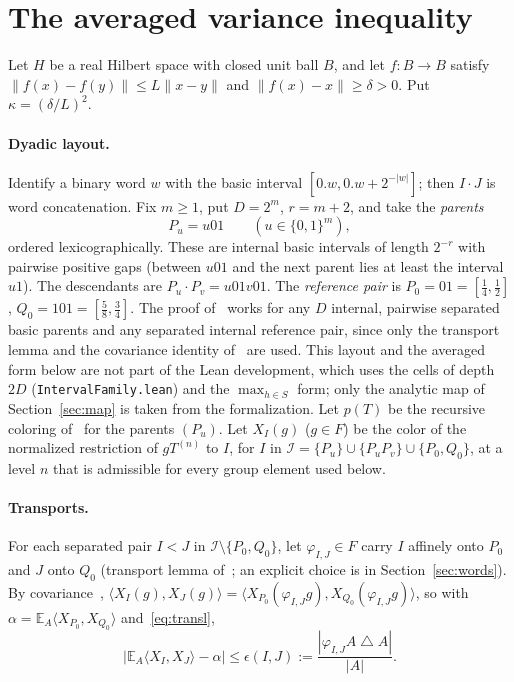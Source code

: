 \documentclass[11pt]{article}
\theoremstyle{definition}
\theoremstyle{remark}
\newcommand{\norm}[1]{\lVert #1\rVert}
\newcommand{\ip}[2]{\langle #1,#2\rangle}
\newcommand{\E}{\mathbb{E}}
\newcommand{\sd}{\mathbin{\triangle}}
\begin{document}
\section{The averaged variance inequality}\label{sec:variance}

Let $H$ be a real Hilbert space with closed unit ball $B$, and let $f:B\to B$ satisfy
$\norm{f(x)-f(y)}\le L\norm{x-y}$ and $\norm{f(x)-x}\ge\delta>0$. Put $\kappa=(\delta/L)^2$.

\paragraph{Dyadic layout.}
Identify a binary word $w$ with the basic interval $[0.w,0.w+2^{-|w|}]$; then $I\cdot J$ is word
concatenation. Fix $m\ge1$, put $D=2^m$, $r=m+2$, and take the \emph{parents}
\[
  P_u=u01\qquad(u\in\{0,1\}^m),
\]
ordered lexicographically. These are internal basic intervals of length $2^{-r}$ with pairwise
positive gaps (between $u01$ and the next parent lies at least the interval $u1$). The descendants
are $P_u\cdot P_v=u01v01$. The \emph{reference pair} is $P_0=01=[\frac14,\frac12]$,
$Q_0=101=[\frac58,\frac34]$. The proof of~\cite{OAI} works for any $D$ internal, pairwise separated
basic parents and any separated internal reference pair, since only the transport lemma and
the covariance identity of~\cite[\S2.1]{OAI} are used. This layout and the averaged form below are not part of the Lean development, which uses the
cells of depth $2D$ (\texttt{IntervalFamily.lean}) and the $\max_{h\in S}$ form; only the analytic
map of Section~\ref{sec:map} is taken from the formalization. Let $p(T)$ be the recursive coloring of~\cite{OAI} for
the parents $(P_u)$. Let $X_I(g)$ ($g\in F$) be the color of the normalized restriction of
$gT^{(n)}$ to $I$, for $I$ in $\mathcal I=\{P_u\}\cup\{P_uP_v\}\cup\{P_0,Q_0\}$, at a level $n$
that is admissible for every group element used below.

\paragraph{Transports.}
For each separated pair $I<J$ in $\mathcal I\setminus\{P_0,Q_0\}$, let $\varphi_{I,J}\in F$ carry
$I$ affinely onto $P_0$ and $J$ onto $Q_0$ (transport lemma of~\cite[\S2.1]{OAI}; an explicit choice is in
Section~\ref{sec:words}). By covariance~\cite[\S2.1]{OAI}, $\ip{X_I(g)}{X_J(g)}=\ip{X_{P_0}(\varphi_{I,J}g)}{X_{Q_0}(\varphi_{I,J}g)}$,
so with $\alpha=\E_A\ip{X_{P_0}}{X_{Q_0}}$ and~\eqref{eq:transl},
\begin{equation}\label{eq:eps}
  \bigl|\E_A\ip{X_I}{X_J}-\alpha\bigr|\le\epsilon(I,J):=\frac{|\varphi_{I,J}A\sd A|}{|A|}.
\end{equation}
\end{document}
